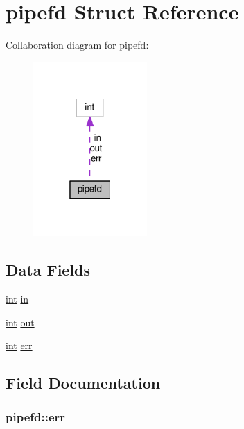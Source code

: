 \hypertarget{structpipefd}{}\section{pipefd Struct Reference}
\label{structpipefd}


Collaboration diagram for pipefd\+:
\nopagebreak
\begin{figure}[H]
\begin{center}
\leavevmode
\includegraphics[width=123pt]{structpipefd__coll__graph}
\end{center}
\end{figure}
\subsection*{Data Fields}
\begin{DoxyCompactItemize}
\item 
\hyperlink{pcre_8txt_a42dfa4ff673c82d8efe7144098fbc198}{int} \hyperlink{structpipefd_ac7f1d8a24c8ee8b7a5e5cc0e58aede56}{in}
\item 
\hyperlink{pcre_8txt_a42dfa4ff673c82d8efe7144098fbc198}{int} \hyperlink{structpipefd_a169c0b58f8cf8b02db6b6ce2eb89b002}{out}
\item 
\hyperlink{pcre_8txt_a42dfa4ff673c82d8efe7144098fbc198}{int} \hyperlink{structpipefd_a684fff145aa2403feafb87e551a8fba7}{err}
\end{DoxyCompactItemize}


\subsection{Field Documentation}
\subsubsection[{\texorpdfstring{err}{err}}]{ pipefd\+::err}\hypertarget{structpipefd_a684fff145aa2403feafb87e551a8fba7}{}\label{structpipefd_a684fff145aa2403feafb87e551a8fba7}
